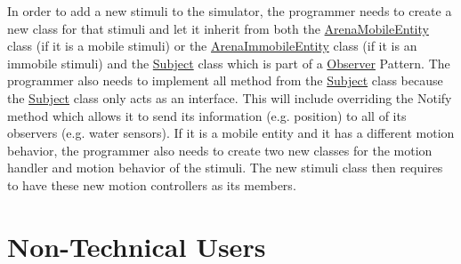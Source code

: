 In order to add a new stimuli to the simulator, the programmer needs to create a new class for that stimuli and let it inherit from both the \hyperlink{classArenaMobileEntity}{Arena\+Mobile\+Entity} class (if it is a mobile stimuli) or the \hyperlink{classArenaImmobileEntity}{Arena\+Immobile\+Entity} class (if it is an immobile stimuli) and the \hyperlink{classSubject}{Subject} class which is part of a \hyperlink{classObserver}{Observer} Pattern. The programmer also needs to implement all method from the \hyperlink{classSubject}{Subject} class because the \hyperlink{classSubject}{Subject} class only acts as an interface. This will include overriding the Notify method which allows it to send its information (e.\+g. position) to all of its observers (e.\+g. water sensors). If it is a mobile entity and it has a different motion behavior, the programmer also needs to create two new classes for the motion handler and motion behavior of the stimuli. The new stimuli class then requires to have these new motion controllers as its members.\hypertarget{index_sub_sec}{}\section{Non-\/\+Technical Users}\label{index_sub_sec}
